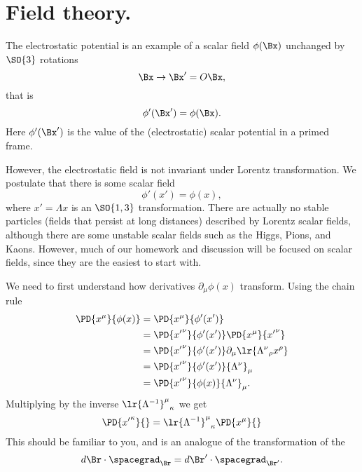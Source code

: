 %
%
\section{Field theory.}

The electrostatic potential is an example of a scalar field \( \phi(\Bx) \) unchanged by \(\SO{3}\) rotations
\begin{equation}\label{eqn:qftLecture3:240}
\Bx \rightarrow \Bx' = O \Bx,
\end{equation}
that is
\begin{equation}\label{eqn:qftLecture3:260}
\phi'(\Bx') = \phi(\Bx).
\end{equation}
Here \( \phi'(\Bx') \) is the value of the (electrostatic) scalar potential in a primed frame.

However, the electrostatic field is not invariant under Lorentz transformation.
We postulate that there is some scalar field
\begin{equation}\label{eqn:qftLecture3:280}
\phi'(x') = \phi(x),
\end{equation}
where \( x' = \Lambda x \) is an \(\SO{1,3}\) transformation.
There are actually no stable particles (fields that persist at long distances) described by Lorentz scalar fields, although there are some unstable scalar fields such as the
Higgs, Pions, and Kaons.
However,
much of our homework and discussion will be focused on scalar fields, since
they are the
easiest to start with.

We need to first understand how derivatives \( \partial_\mu \phi(x) \) transform.  Using the chain rule
\begin{equation}\label{eqn:qftLecture3:300}
\begin{aligned}
\PD{x^\mu}{\phi(x)}
&=
\PD{x^\mu}{\phi'(x')} \\
&=
\PD{{x'}^\nu}{\phi'(x')}
\PD{{x}^\mu}{{x'}^\nu} \\
&=
\PD{{x'}^\nu}{\phi'(x')}
\partial_\mu \lr{
{\Lambda^\nu}_\rho x^\rho
} \\
&=
\PD{{x'}^\nu}{\phi'(x')}
{\Lambda^\nu}_\mu \\
&=
\PD{{x'}^\nu}{\phi(x)}
{\Lambda^\nu}_\mu.
\end{aligned}
\end{equation}
Multiplying by the inverse \( {\lr{\Lambda^{-1}}^\mu}_\kappa \) we get
\begin{equation}\label{eqn:qftLecture3:320}
\PD{{x'}^\kappa}{}
=
{\lr{\Lambda^{-1}}^\mu}_\kappa \PD{x^\mu}{}
\end{equation}
This should be familiar to you, and is an analogue of the transformation of the
\begin{equation}\label{eqn:qftLecture3:340}
d\Br \cdot \spacegrad_\Br
=
d\Br' \cdot \spacegrad_{\Br'}.
\end{equation}
